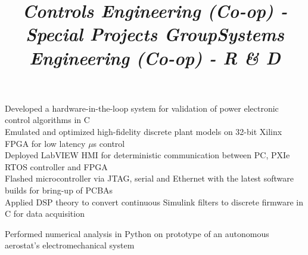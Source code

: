 \documentclass[mm]{res}
\begin{document}
\begin{resume}
\title{\textsl{Controls Engineering (Co-op) - Special Projects Group}}
\begin{position}
\tb Developed a hardware-in-the-loop system for validation of power electronic control algorithms in C\\
\tb Emulated and optimized high-fidelity discrete plant models on 32-bit Xilinx FPGA for low latency $\mu$s control\\
\tb Deployed LabVIEW HMI for deterministic communication between PC, PXIe RTOS controller and FPGA\\
\tb Flashed microcontroller via JTAG, serial and Ethernet with the latest software builds for bring-up of PCBAs\\
\tb Applied DSP theory to convert continuous Simulink filters to discrete firmware in C for data acquisition
\end{position}

\title{\textsl{Systems Engineering (Co-op) - R \& D}}
\begin{position}
\tb Performed numerical analysis in Python on prototype of an autonomous aerostat's electromechanical system
\end{position}


\end{resume}
\end{document}
